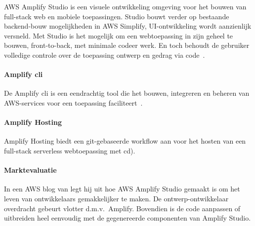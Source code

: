 AWS Amplify Studio is een visuele ontwikkeling omgeving voor het bouwen van full-stack web en mobiele toepassingen.
Studio bouwt verder op bestaande backend-bouw mogelijkheden in AWS Simplify, UI-ontwikkeling wordt aanzienlijk versneld.
Met Studio is het mogelijk om een webtoepassing in zijn geheel te bouwen, front-to-back, met minimale codeer werk.
En toch behoudt de gebruiker volledige controle over de toepassing ontwerp en gedrag via code~\autocite{AWSAmplifyDocs}.

\paragraph{Amplify \acrshort{cli}}

De Amplify \acrfull{cli} is een eendrachtig tool die het bouwen, integreren en beheren van AWS-services voor een toepassing faciliteert~\autocite{AWSAmplifyDocs}.

\paragraph{Amplify Hosting}


Amplify Hosting biedt een git-gebaseerde workflow aan voor het hosten van een full-stack serverless webtoepassing met \acrfull{cd}).

\paragraph{Marktevaluatie}


In een AWS blog van \textcite{Spittel2022} legt hij uit hoe AWS Amplify Studio gemaakt is om het leven van ontwikkelaars gemakkelijker te maken.
De ontwerp-ontwikkelaar overdracht gebeurt vlotter d.m.v.\ Amplify.
Bovendien is de code aanpassen of uitbreiden heel eenvoudig met de gegenereerde componenten van Amplify Studio.

